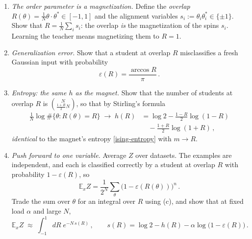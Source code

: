 \documentclass[11pt]{article}
\newcommand{\E}{\mathbb{E}}
\begin{document}
\begin{exercise}
\label{ex:ising}
\important
\begin{enumerate}
    \item \emph{The order parameter is a magnetization.} Define the \emph{overlap} $R(\theta) = \frac{1}{N}\theta\cdot\theta^*\in[-1,1]$ and the alignment variables $s_i := \theta_i\theta_i^*\in\{\pm1\}$. Show that $R = \frac{1}{N}\sum_i s_i$: the overlap \emph{is} the magnetization of the spins $s_i$. Learning the teacher means magnetizing them to $R=1$.
    \item \emph{Generalization error.} Show that a student at overlap $R$ misclassifies a fresh Gaussian input with probability
    \begin{equation}
        \varepsilon(R) = \frac{\arccos R}{\pi}\,. \label{eps-of-R}
    \end{equation}
    \item \emph{Entropy: the same $h$ as the magnet.} Show that the number of students at overlap $R$ is $\binom{N}{\frac{1+R}{2}N}$, so that by Stirling's formula
    \begin{equation}
        \begin{aligned}
        \frac{1}{N}\log\#\{\theta : R(\theta) = R\} \;\to\; h(R) &= \log 2 - \frac{1-R}{2}\log(1-R) \\ &\quad - \frac{1+R}{2}\log(1+R)\,,
        \end{aligned}
    \end{equation}
    \emph{identical} to the magnet's entropy \eqref{ising-entropy} with $m\to R$.
    \item \emph{Push forward to one variable.} Average $Z$ over datasets. The examples are independent, and each is classified correctly by a student at overlap $R$ with probability $1-\varepsilon(R)$, so
    \begin{equation}
        \E_x Z = \frac{1}{2^N}\sum_\theta\big(1-\varepsilon(R(\theta))\big)^n\,.
    \end{equation}
    Trade the sum over $\theta$ for an integral over $R$ using (c), and show that at fixed load $\alpha$ and large $N$,
    \begin{equation}
        \E_x Z \;\approx\; \int_{-1}^{1}dR\; e^{-N\,s(R)}\,,\qquad s(R) = \log 2 - h(R) - \alpha\log\big(1-\varepsilon(R)\big)\,. \label{perc-action}

\end{equation}
\end{enumerate}
\end{exercise}
\end{document}
